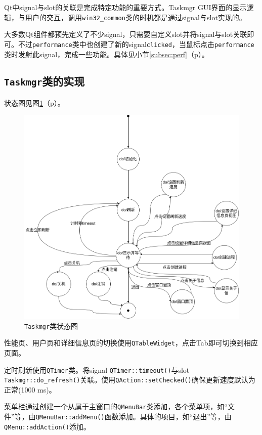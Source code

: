 \documentclass[UTF8,twoside,titlepage]{ctexart}
\newcommand\code[1]{\texttt{#1}}
\newcommand\myref[1]{\ref{#1}（p\pageref{#1}）}
\begin{document}
Qt中signal与slot的关联是完成特定功能的重要方式。Taskmgr GUI界面的显示逻辑，与用户的交互，调用\code{win32\_common}类的时机都是通过signal与slot实现的。

大多数Qt组件都预先定义了不少signal，只需要自定义slot并将signal与slot关联即可。不过\code{performance}类中也创建了新的signal\code{clicked}，当鼠标点击\code{performance}类时发射此signal，完成一些功能。具体见小节\myref{subsec:perf}。

\subsection{\code{Taskmgr}类的实现}
状态图见图\myref{fig:taskmgrstat}。

\begin{figure}[htb]
    \centering
    \includegraphics[scale=0.43]{../dia/taskmgr.png}
    \caption{\code{Taskmgr}类状态图}
    \label{fig:taskmgrstat}
\end{figure}

性能页、用户页和详细信息页的切换使用\code{QTableWidget}，点击Tab即可切换到相应页面。

定时刷新使用\code{QTimer}类。将signal \code{QTimer::timeout()}与slot \code{Taskmgr::do\_refresh()}关联。使用\code{QAction::setChecked()}确保更新速度默认为正常(1000 ms)。

菜单栏通过创建一个从属于主窗口的\code{QMenuBar}类添加，各个菜单项，如``文件''等，由\code{QMenuBar::\linebreak addMenu()}函数添加。具体的项目，如``退出''等，由\code{QMenu::addAction()}添加。
\end{document}
